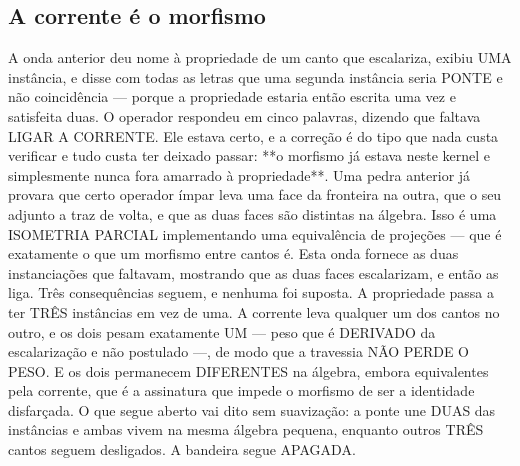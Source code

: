 \documentclass[11pt]{article}
\theoremstyle{definition}\newtheorem{deriv}{Derivação}
\begin{document}
\subsection*{A corrente \'e o morfismo}A onda anterior deu nome \`a propriedade de um canto que escalariza, exibiu UMA inst\^ancia, e disse com todas as letras que uma segunda inst\^ancia seria PONTE e n\~ao coincid\^encia --- porque a propriedade estaria ent\~ao escrita uma vez e satisfeita duas. O operador respondeu em cinco palavras, dizendo que faltava LIGAR A CORRENTE. Ele estava certo, e a corre\c{c}\~ao \'e do tipo que nada custa verificar e tudo custa ter deixado passar: **o morfismo j\'a estava neste kernel e simplesmente nunca fora amarrado \`a propriedade**. Uma pedra anterior j\'a provara que certo operador \'impar leva uma face da fronteira na outra, que o seu adjunto a traz de volta, e que as duas faces s\~ao distintas na \'algebra. Isso \'e uma ISOMETRIA PARCIAL implementando uma equival\^encia de proje\c{c}\~oes --- que \'e exatamente o que um morfismo entre cantos \'e. Esta onda fornece as duas instancia\c{c}\~oes que faltavam, mostrando que as duas faces escalarizam, e ent\~ao as liga. Tr\^es consequ\^encias seguem, e nenhuma foi suposta. A propriedade passa a ter TR\^ES inst\^ancias em vez de uma. A corrente leva qualquer um dos cantos no outro, e os dois pesam exatamente UM --- peso que \'e DERIVADO da escalariza\c{c}\~ao e n\~ao postulado ---, de modo que a travessia N\~AO PERDE O PESO. E os dois permanecem DIFERENTES na \'algebra, embora equivalentes pela corrente, que \'e a assinatura que impede o morfismo de ser a identidade disfar\c{c}ada. O que segue aberto vai dito sem suaviza\c{c}\~ao: a ponte une DUAS das inst\^ancias e ambas vivem na mesma \'algebra pequena, enquanto outros TR\^ES cantos seguem desligados. A bandeira segue APAGADA.
\end{document}
